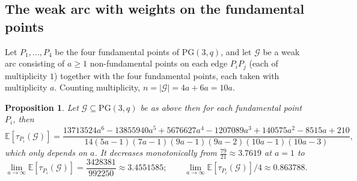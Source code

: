 \documentclass{article}
\newtheorem{proposition}{Proposition}
\newcommand{\PG}{\mathrm{PG}}
\newcommand{\Gscr}{\mathscr{G}}
\newcommand{\E}{\mathbb{E}}
\begin{document}



\subsection{The weak arc with weights on the fundamental points}

Let $P_1,\dots,P_4$ be the four fundamental points of $\PG(3,q)$, and let $\Gscr$ be a weak arc
consisting of $a\ge1$ non-fundamental points on each edge $P_iP_j$ (each of multiplicity $1$) together with
the four fundamental points, each taken with multiplicity $a$. Counting multiplicity, $
n=|\Gscr|=4a+6a=10a$.


\begin{proposition}\label{lem:weakarc}
Let $\Gscr\subseteq\PG(3,q)$ be as above then for each fundamental point $P_i$, then
\[
\E[\tau_{P_i}(\Gscr)]
=\frac{13713524a^{6}-13855940a^{5}+5676627a^{4}-1207089a^{3}+140575a^{2}-8515a+210}
{14(5a-1)(7a-1)(9a-1)(9a-2)(10a-1)(10a-3)} ,
\]
which only depends on $a$. It decreases monotonically from
$\tfrac{79}{21}\approx3.7619$ at $a=1$ to
\[
\lim_{a\to\infty}\E[\tau_{P_i}(\Gscr)]=\frac{3428381}{992250}\approx3.4551585 ;\qquad \lim_{a\to\infty}\E[\tau_{P_i}(\Gscr)]/4\approx 0.863788.
\]
\end{proposition}
\end{document}
